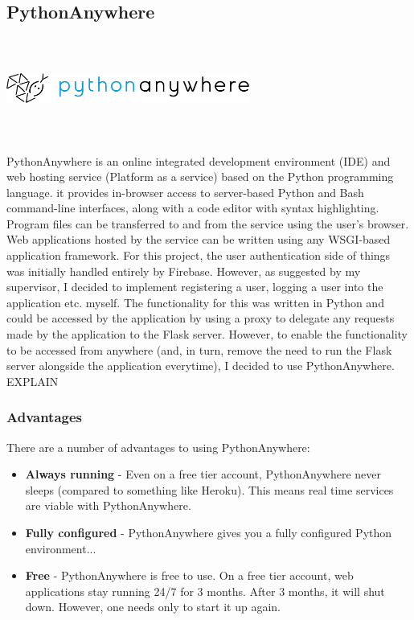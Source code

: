 \newpage
\subsection{PythonAnywhere}
\par
\medskip
\begin{center}
    \includegraphics[width=8cm,height=3.3cm,keepaspectratio]{images/pythonanywhere}
\end{center}
PythonAnywhere is an online integrated development environment (IDE) and web
hosting service (Platform as a service) based on the Python programming 
language. it provides in-browser access to server-based Python and Bash 
command-line interfaces, along with a code editor with syntax highlighting. 
Program files can be transferred to and from the service using the user's 
browser. Web applications hosted by the service can be written using any 
WSGI-based application framework. For this project, the user authentication side
of things was initially handled entirely by Firebase. However, as suggested by 
my supervisor, I decided to implement registering a user, logging a user into 
the application etc. myself. The functionality for this was written in Python 
and could be accessed by the application by using a proxy to delegate any 
requests made by the application to the Flask server. However, to enable the 
functionality to be accessed from anywhere (and, in turn, remove the need to run
the Flask server alongside the application everytime), I decided to use 
PythonAnywhere. EXPLAIN

\subsubsection{Advantages}
There are a number of advantages to using PythonAnywhere:

\begin{itemize}
    \item \textbf{Always running} - Even on a free tier account, PythonAnywhere
    never sleeps (compared to something like Heroku). This means real time 
    services are viable with PythonAnywhere.
    \item \textbf{Fully configured} - PythonAnywhere gives you a fully
    configured Python environment...
    \item \textbf{Free} - PythonAnywhere is free to use. On a free tier account,
    web applications stay running 24/7 for 3 months. After 3 months, it will
    shut down. However, one needs only to start it up again.
\end{itemize}

